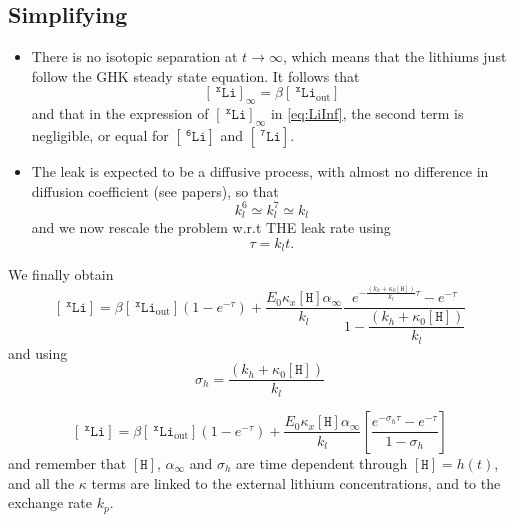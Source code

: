 \documentclass[aps,onecolumn,11pt]{revtex4}
\newcommand{\mychem}[1]{\mathtt{#1}}
\newcommand{\myconc}[1]{\left\lbrack{#1}\right\rbrack}
\newcommand{\spLi}[1]{{~^{\mychem{#1}}\mychem{Li}}}
\newcommand{\Li}[1]{\myconc{\spLi{#1}}}
\newcommand{\spLiOut}[1]{{\spLi{#1}}_{\mathrm{out}}}
\newcommand{\LiOut}[1]{\myconc{\spLiOut{#1}}}
\newcommand{\spproton}{\mychem{H}}
\newcommand{\proton}{\myconc{\spproton}}
\begin{document}
\subsection{Simplifying}
\begin{itemize}
\item
There is no isotopic separation at $t\to\infty$, which means that
the lithiums just follow the GHK steady state equation.
It follows that
\begin{equation}
\boxed{
	\Li{x}_\infty = \beta \LiOut{x}
	}
\end{equation}
and that in the expression of $\Li{x}_\infty$ in \eqref{eq:LiInf}, the second term is negligible, or equal for $\Li{6}$ and $\Li{7}$.
\item The leak is expected to be a diffusive process, with almost no difference in diffusion coefficient (see papers),
so that 
\begin{equation}
	k_l^6 \simeq k_l^7 \simeq k_l
\end{equation}
and we now rescale the problem w.r.t THE leak rate using
\begin{equation}
	\tau = k_l t.
\end{equation}
\end{itemize}

We finally obtain
\begin{equation}
\Li{x} = \beta \LiOut{x} \left(1-e^{ -\tau }\right) + 
	\dfrac{E_0 \kappa_x \proton \alpha_\infty}{k_l}
	 \dfrac{e^{-\frac{(k_h+\kappa_0\proton)}{k_l}\tau} - e^{-\tau} }{1 - \dfrac{(k_h+\kappa_0\proton)}{k_l}}
\end{equation}
and using
\begin{equation}
	\sigma_h = \dfrac{(k_h+\kappa_0\proton)}{k_l}
\end{equation}

\begin{equation}
	\Li{x} = \beta \LiOut{x} \left(1-e^{ -\tau }\right) + 
	\dfrac{E_0 \kappa_x \proton \alpha_\infty}{k_l}
	\left[
	 \dfrac{e^{-\sigma_h\tau} - e^{-\tau} }{1 - \sigma_h}\right]
\end{equation}
and remember that $\proton$, $\alpha_\infty$ and $\sigma_h$ are time dependent through $\proton=h(t)$, and all the $\kappa$ terms are linked to the external lithium concentrations, and to the exchange rate $k_p$.
\end{document}

